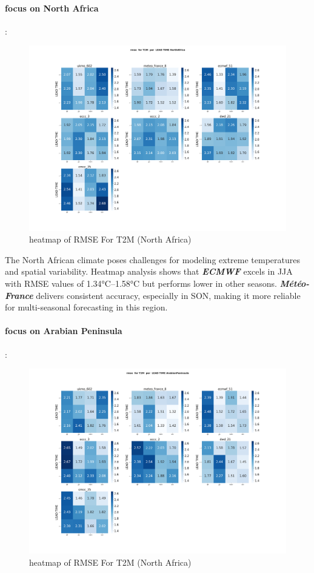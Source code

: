 \paragraph{focus on North Africa} : 
\begin{figure}[H]
\centering
\includegraphics[scale=0.3]{plots/det/rmse/rmse_T2M_NorthAfrica.png}
\caption{heatmap of RMSE For T2M  (North Africa)}
\end{figure}

The North African climate poses challenges for modeling extreme temperatures and spatial variability. Heatmap analysis shows that \textbf{\textit{ECMWF}} excels in JJA with RMSE values of 1.34°C–1.58°C but performs lower in other seasons. \textbf{\textit{Météo-France}} delivers consistent accuracy, especially in SON, making it more reliable for multi-seasonal forecasting in this region.
\vspace{1.5cm}
\paragraph{focus on Arabian Peninsula}:

\begin{figure}[H]
\centering
\includegraphics[scale=0.3]{plots/det/rmse/rmse_T2M_ArabianPeninsula.png}
\caption{heatmap of RMSE For T2M  (North Africa)}
\end{figure}

